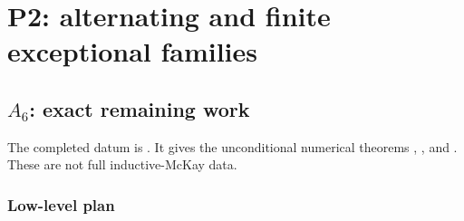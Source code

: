 \documentclass[11pt]{article}
\begin{document}
\section{P2: alternating and finite exceptional families}

\subsection{\(A_6\): exact remaining work}\label{sec:a6}

The completed datum is
.  It gives
the unconditional numerical theorems
,
, and
.  These
are not full inductive-McKay data.

\subsubsection*{Low-level plan}
\end{document}
